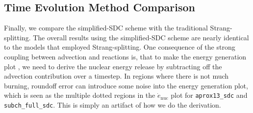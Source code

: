 \documentclass[preprint,times,tighten,linenumbers,trackchanges]{aastex631}
\begin{document}





 \subsection{Time Evolution Method Comparison}\label{Sec:result_integration}







Finally, we compare the simplified-SDC scheme with the traditional Strang-splitting. The overall results using the simplified-SDC scheme are nearly identical to the models that employed Strang-splitting.
One consequence of the strong coupling between advection and reactions is, that to make the energy generation plot , we need to derive the nuclear energy release by subtracting off the advection contribution over a timestep. In regions where there is not much burning, roundoff error can introduce some noise into the energy generation plot, which is seen as the multiple dotted regions in the $\dot{e}_{\textrm{nuc}}$ plot for {\tt aprox13\_sdc} and {\tt subch\_full\_sdc}.  This is simply an artifact of how we do the derivation.
\end{document}

